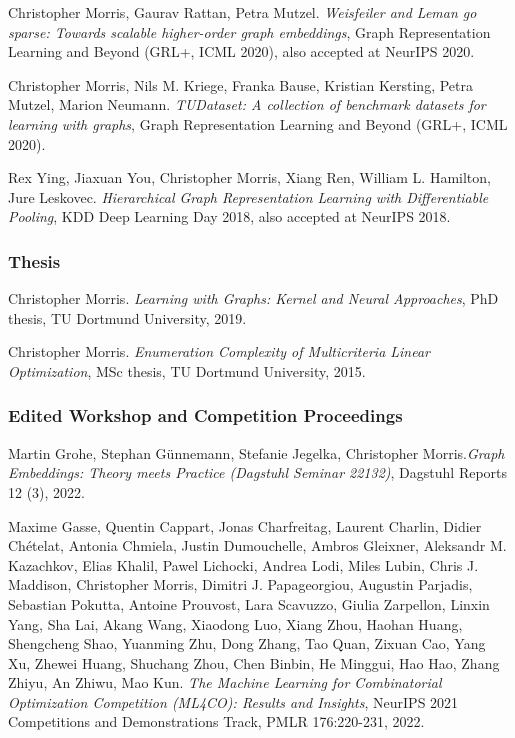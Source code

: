 \documentclass[11pt, a4paper, DIV=14, headings=small]{scrartcl}
\begin{document}
\begin{thebibliography}{15}
		Christopher Morris, Gaurav Rattan, Petra Mutzel.
		\emph{Weisfeiler and Leman go sparse: Towards scalable higher-order graph embeddings},
		Graph Representation Learning and Beyond (GRL+, ICML 2020), also accepted at NeurIPS 2020.
		
		Christopher Morris, Nils M. Kriege, Franka Bause, Kristian Kersting, Petra Mutzel, Marion Neumann.
		\emph{TUDataset: A collection of benchmark datasets for learning with graphs},
		Graph Representation Learning and Beyond (GRL+, ICML 2020).
		
		Rex Ying, Jiaxuan You, Christopher Morris, Xiang Ren, William L. Hamilton, Jure Leskovec.
		\emph{Hierarchical Graph Representation Learning with Differentiable Pooling},
		KDD Deep Learning Day 2018, also accepted at NeurIPS 2018.
		
		\subsubsection*{Thesis}
		
		Christopher Morris.
		\emph{Learning with Graphs: Kernel and Neural Approaches}, PhD thesis, TU Dortmund University, 2019.
		
		Christopher Morris.
		\emph{Enumeration Complexity of Multicriteria Linear Optimization}, MSc thesis, TU Dortmund University, 2015.
		
		\subsubsection*{Edited Workshop and Competition Proceedings}
		
		Martin Grohe, Stephan Günnemann, Stefanie Jegelka, Christopher Morris.\footnotemark[2]
		\emph{Graph Embeddings: Theory meets Practice (Dagstuhl Seminar 22132)},
		Dagstuhl Reports 12 (3), 2022.
		
		Maxime Gasse, Quentin Cappart, Jonas Charfreitag, Laurent Charlin, Didier Chételat, Antonia Chmiela, Justin Dumouchelle, Ambros Gleixner, Aleksandr M. Kazachkov, Elias Khalil, Pawel Lichocki, Andrea Lodi, Miles Lubin, Chris J. Maddison, Christopher Morris, Dimitri J. Papageorgiou, Augustin Parjadis, Sebastian Pokutta, Antoine Prouvost, Lara Scavuzzo, Giulia Zarpellon, Linxin Yang, Sha Lai, Akang Wang, Xiaodong Luo, Xiang Zhou, Haohan Huang, Shengcheng Shao, Yuanming Zhu, Dong Zhang, Tao Quan, Zixuan Cao, Yang Xu, Zhewei Huang, Shuchang Zhou, Chen Binbin, He Minggui, Hao Hao, Zhang Zhiyu, An Zhiwu, Mao Kun.
		\emph{The Machine Learning for Combinatorial Optimization Competition (ML4CO): Results and Insights}, NeurIPS 2021 Competitions and Demonstrations Track, PMLR 176:220-231, 2022.
		
		

	\end{thebibliography}
	
\end{document}
